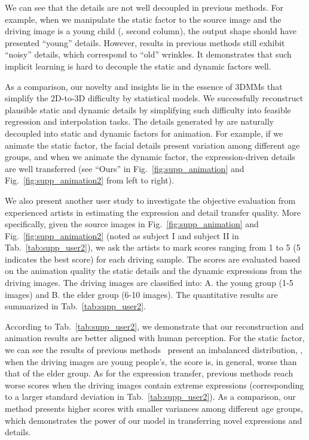 We can see that the details are not well decoupled in previous methods.
For example, when we manipulate the static factor to the source image and the driving image is a young child ({\eg}, second column), the output shape should have presented ``young'' details.
However, results in previous methods still exhibit ``noisy'' details, which correspond to ``old'' wrinkles. It demonstrates that such implicit learning is hard to decouple the static and dynamic factors well.

As a comparison, our novelty and insights lie in the essence of 3DMMs that simplify the 2D-to-3D difficulty by statistical models.
We successfully reconstruct plausible static and dynamic details by simplifying such difficulty into feasible regression and interpolation tasks.
The details generated by {\name} are naturally decoupled into static and dynamic factors for animation. For example, if we animate the static factor, the facial details present variation among different age groups, and when we animate the dynamic factor, the expression-driven details are well transferred (see ``Ours'' in Fig.~\ref{fig:supp_animation} and Fig.~\ref{fig:supp_animation2} from left to right). 


 We also present another user study to investigate the objective evaluation from  experienced artists in estimating the expression and detail transfer quality. 
More specifically, given the source images in Fig.~\ref{fig:supp_animation} and Fig.~\ref{fig:supp_animation2} (noted as subject I and subject II in Tab.~\ref{tab:supp_user2}), we ask the artists to mark scores ranging from 1 to 5 (5 indicates the best score) for each driving sample.
The scores are evaluated based on the animation quality {\wrt} the static details and the dynamic expressions from the driving images. The driving images are classified into: A. the young group (1-5 images) and B. the elder group (6-10 images). The quantitative results are summarized in Tab.~\ref{tab:supp_user2}.

According to Tab.~\ref{tab:supp_user2}, we demonstrate that our reconstruction and animation results are better aligned with human perception. For the static factor, we can see the results of previous methods~ present an imbalanced distribution, {\ie}, when the driving images are young people's, the score is, in general, worse than that of the elder group. As for the expression transfer, previous methods reach worse scores when the driving images contain extreme expressions (corresponding to a larger standard deviation in Tab.~\ref{tab:supp_user2}). As a comparison, our method presents higher scores with smaller variances among different age groups, which demonstrates the power of our model in transferring novel expressions and details.







